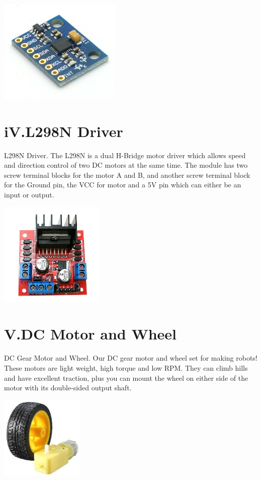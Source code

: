 \documentclass[12pt]{article}
\begin{document}
\includegraphics[height=5cm]{MP.jpg}

\section*{iV.L298N Driver}
L298N Driver. The L298N is a dual H-Bridge motor driver which allows speed and direction control of two DC motors at the same time. The module has two screw terminal blocks for the motor A and B, and another screw terminal block for the Ground pin, the VCC for motor and a 5V pin which can either be an input or output.

\includegraphics[height=5cm]{L.jpg}
\pagebreak
\section*{V.DC Motor and Wheel}
DC Gear Motor and Wheel. Our DC gear motor and wheel set for making robots! These motors are light weight, high torque and low RPM. They can climb hills and have excellent traction, plus you can mount the wheel on either side of the motor with its double-sided output shaft.

\includegraphics[height=4cm]{Ca.jpg}
\end{document}

